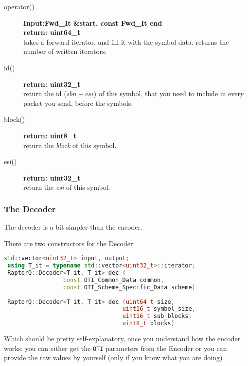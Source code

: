 \documentclass[11pt,a4paper]{refart}
\begin{document}
\begin{description}
\item[operator()]\textbf{Input:Fwd\_It \&start, const Fwd\_It end}\\
\textbf{return: uint64\_t}\\
takes a forward iterator, and fill it with the symbol data. returns the number of written iterators.
\item[id()]\textbf{return: uint32\_t}\\
return the id (\textit{$sbn + esi$}) of this symbol, that you need to include in every packet you send, before the symbols.
\item[block()]\textbf{return: uint8\_t}\\
return the \textit{block} of this symbol.
\item[esi()]\textbf{return: uint32\_t}\\
return the \textit{esi} of this symbol.
\end{description}

\subsubsection{The Decoder}

The decoder is a bit simpler than the encoder.

There are two constructors for the Decoder:

\begin{lstlisting}[language=C++]
 std::vector<uint32_t> input, output;
 using T_it = typename std::vector<uint32_t>::iterator;
 RaptorQ::Decoder<T_it, T_it> dec (
                 const OTI_Common_Data common,
                 const OTI_Scheme_Specific_Data scheme)
                              
 RaptorQ::Decoder<T_it, T_it> dec (uint64_t size,
                                  uint16_t symbol_size,
                                  uint16_t sub_blocks,
                                  uint8_t blocks)
\end{lstlisting}

Which should be pretty self-explanatory, once you understand how the encoder works:
you can either get the \texttt{OTI} parameters from the Encoder or you can provide the raw values by yourself (only if you know what you are doing)
\end{document}
